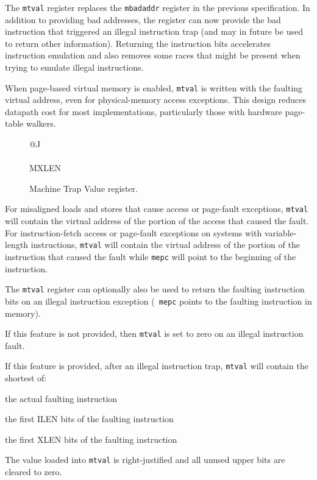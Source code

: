 \begin{commentary}
  The {\tt mtval} register replaces the {\tt mbadaddr} register in
  the previous specification.  In addition to providing bad addresses,
  the register can now provide the bad instruction that triggered an
  illegal instruction trap (and may in future be used to return other
  information).  Returning the instruction bits accelerates instruction emulation and also
  removes some races that might be present when trying to emulate
  illegal instructions.
\end{commentary}
\begin{commentary}
  When page-based virtual memory is enabled, {\tt mtval} is written with
  the faulting virtual address, even for physical-memory access exceptions.
  This design reduces datapath cost for most implementations, particularly
  those with hardware page-table walkers.
\end{commentary}

\begin{figure}[h!]
{\footnotesize
\begin{center}
\begin{tabular}{@{}J}
 \\
\hline
{} \\
\hline
MXLEN \\
\end{tabular}
\end{center}
}
\vspace{-0.1in}
\caption{Machine Trap Value register.}
\label{mtvalreg}
\end{figure}

For misaligned loads and stores that cause access or page-fault exceptions,
{\tt mtval} will contain the virtual address of the portion of the access that
caused the fault.  For instruction-fetch access or page-fault exceptions on
systems with variable-length instructions, {\tt mtval} will contain the
virtual address of the portion of the instruction that caused the fault while
{\tt mepc} will point to the beginning of the instruction.

The {\tt mtval} register can optionally also be used to return the
faulting instruction bits on an illegal instruction exception ({\tt
  mepc} points to the faulting instruction in memory).

If this feature is not provided, then {\tt mtval} is set to zero on
an illegal instruction fault.

If this feature is provided, after an illegal instruction trap, {\tt mtval}
will contain the shortest of:
\begin{compactitem}
\item the actual faulting instruction
\item the first ILEN bits of the faulting instruction
\item the first XLEN bits of the faulting instruction
\end{compactitem}
The value loaded into {\tt mtval} is right-justified and all unused upper
bits are cleared to zero.

